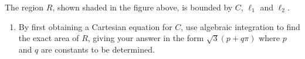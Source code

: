 \documentclass[leqno]{article}
\begin{document}
\begin{enumerate}[
  label=\textbf{\arabic*.},
  leftmargin=*,
  topsep=0pt,
  partopsep=0pt,
  parsep=0pt
]
The region $R$, shown shaded in the figure above, is bounded by $C$, $\ell_1$ and $\ell_2$. \\
\begin{enumerate}[label=\textbf{(\alph*)}, resume]
  \item By first obtaining a Cartesian equation for $C$, use algebraic integration to find the exact area of $R$, giving your answer in the form $\sqrt{3}(p + q\pi)$ where $p$ and $q$ are constants to be determined.  \\
\end{enumerate}


\end{enumerate}
\end{document}
